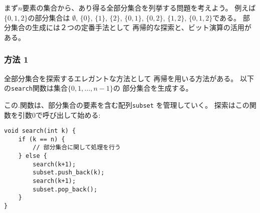 
まず$n$要素の集合から、あり得る全部分集合を列挙する問題を考えよう。
例えば$\{0,1,2\}$の部分集合は
$\emptyset$, $\{0\}$, $\{1\}$, $\{2\}$, $\{0,1\}$,
$\{0,2\}$, $\{1,2\}$, $\{0,1,2\}$である。
部分集合の生成には２つの定番手法として
再帰的な探索と、ビット演算の活用がある。


\begin{comment}
\subsubsection{Method 1}

An elegant way to go through all subsets
of a set is to use recursion.
The following function \texttt{search}
generates the subsets of the set
$\{0,1,\ldots,n-1\}$.
The function maintains a vector \texttt{subset}
that will contain the elements of each subset.
The search begins when the function is called
with parameter 0.

\begin{lstlisting}
void search(int k) {
    if (k == n) {
        // process subset
    } else {
        search(k+1);
        subset.push_back(k);
        search(k+1);
        subset.pop_back();
    }
}
\end{lstlisting}
\end{comment}

\subsubsection{方法 1}

全部分集合を探索するエレガントな方法として
再帰を用いる方法がある。
以下の\texttt{search}関数は集合$\{0,1,\ldots,n-1\}$の
部分集合を生成する。

この.関数は、部分集合の要素を含む配列\texttt{subset}
を管理していく。
探索はこの関数を引数0で呼び出して始める:

\begin{lstlisting}
void search(int k) {
    if (k == n) {
        // 部分集合に関して処理を行う
    } else {
        search(k+1);
        subset.push_back(k);
        search(k+1);
        subset.pop_back();
    }
}
\end{lstlisting}

\begin{comment}
When the function \texttt{search}
is called with parameter $k$,
it decides whether to include the
element $k$ in the subset or not,
and in both cases,
then calls itself with parameter $k+1$
However, if $k=n$, the function notices that
all elements have been processed
and a subset has been generated.

The following tree illustrates the function calls when $n=3$.
We can always choose either the left branch
($k$ is not included in the subset) or the right branch
($k$ is included in the subset).
\end{comment}

